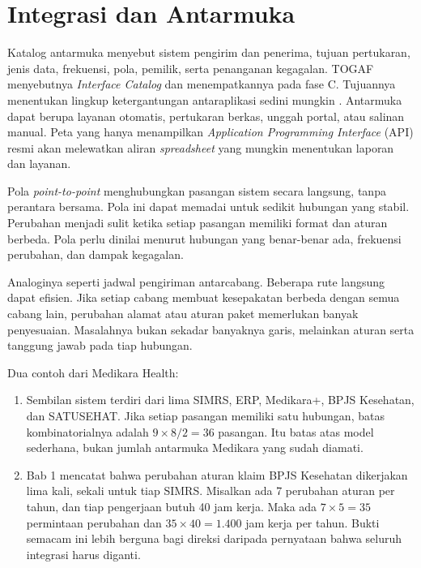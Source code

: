 \section{Integrasi dan Antarmuka}

Katalog antarmuka menyebut sistem pengirim dan penerima, tujuan pertukaran, jenis data, frekuensi,
pola, pemilik, serta penanganan kegagalan. TOGAF menyebutnya \textit{Interface Catalog} dan
menempatkannya pada fase C. Tujuannya menentukan lingkup ketergantungan antaraplikasi sedini mungkin
\cite{togaf10}. Antarmuka dapat berupa layanan otomatis, pertukaran berkas, unggah portal, atau salinan
manual. Peta yang hanya menampilkan \textit{Application Programming Interface} (API) resmi akan melewatkan
aliran \textit{spreadsheet} yang mungkin menentukan laporan dan layanan.

Pola \textit{point-to-point} menghubungkan pasangan sistem secara langsung, tanpa perantara bersama. Pola
ini dapat memadai untuk sedikit hubungan yang stabil. Perubahan menjadi sulit ketika setiap pasangan
memiliki format dan aturan berbeda. Pola perlu dinilai menurut hubungan yang benar-benar ada, frekuensi
perubahan, dan dampak kegagalan.

Analoginya seperti jadwal pengiriman antarcabang. Beberapa rute langsung dapat efisien. Jika setiap
cabang membuat kesepakatan berbeda dengan semua cabang lain, perubahan alamat atau aturan paket memerlukan
banyak penyesuaian. Masalahnya bukan sekadar banyaknya garis, melainkan aturan serta tanggung jawab pada
tiap hubungan.

Dua contoh dari Medikara Health:

\begin{enumerate}
  \item Sembilan sistem terdiri dari lima SIMRS, ERP, Medikara+, BPJS Kesehatan, dan SATUSEHAT. Jika setiap
        pasangan memiliki satu hubungan, batas kombinatorialnya adalah $9 \times 8 / 2 = 36$ pasangan. Itu
        batas atas model sederhana, bukan jumlah antarmuka Medikara yang sudah diamati.
  \item Bab 1 mencatat bahwa perubahan aturan klaim BPJS Kesehatan dikerjakan lima kali, sekali untuk tiap
        SIMRS. Misalkan ada 7 perubahan aturan per tahun, dan tiap pengerjaan butuh 40 jam kerja. Maka ada
        $7 \times 5 = 35$ permintaan perubahan dan $35 \times 40 = 1.400$ jam kerja per tahun. Bukti
        semacam ini lebih berguna bagi direksi daripada pernyataan bahwa seluruh integrasi harus diganti.
\end{enumerate}

